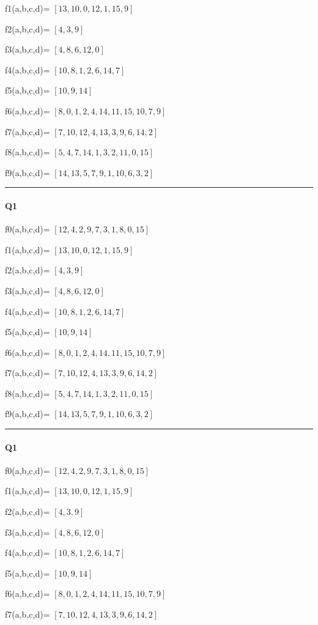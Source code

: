 f1(a,b,c,d)= $[13, 10, 0, 12, 1, 15, 9]$

f2(a,b,c,d)= $[4, 3, 9]$

f3(a,b,c,d)= $[4, 8, 6, 12, 0]$

f4(a,b,c,d)= $[10, 8, 1, 2, 6, 14, 7]$

f5(a,b,c,d)= $[10, 9, 14]$

f6(a,b,c,d)= $[8, 0, 1, 2, 4, 14, 11, 15, 10, 7, 9]$

f7(a,b,c,d)= $[7, 10, 12, 4, 13, 3, 9, 6, 14, 2]$

f8(a,b,c,d)= $[5, 4, 7, 14, 1, 3, 2, 11, 0, 15]$

f9(a,b,c,d)= $[14, 13, 5, 7, 9, 1, 10, 6, 3, 2]$


\hrule width 1\linewidth
\paragraph{Q1}


f0(a,b,c,d)= $[12, 4, 2, 9, 7, 3, 1, 8, 0, 15]$

f1(a,b,c,d)= $[13, 10, 0, 12, 1, 15, 9]$

f2(a,b,c,d)= $[4, 3, 9]$

f3(a,b,c,d)= $[4, 8, 6, 12, 0]$

f4(a,b,c,d)= $[10, 8, 1, 2, 6, 14, 7]$

f5(a,b,c,d)= $[10, 9, 14]$

f6(a,b,c,d)= $[8, 0, 1, 2, 4, 14, 11, 15, 10, 7, 9]$

f7(a,b,c,d)= $[7, 10, 12, 4, 13, 3, 9, 6, 14, 2]$

f8(a,b,c,d)= $[5, 4, 7, 14, 1, 3, 2, 11, 0, 15]$

f9(a,b,c,d)= $[14, 13, 5, 7, 9, 1, 10, 6, 3, 2]$


\hrule width 1\linewidth
\paragraph{Q1}


f0(a,b,c,d)= $[12, 4, 2, 9, 7, 3, 1, 8, 0, 15]$

f1(a,b,c,d)= $[13, 10, 0, 12, 1, 15, 9]$

f2(a,b,c,d)= $[4, 3, 9]$

f3(a,b,c,d)= $[4, 8, 6, 12, 0]$

f4(a,b,c,d)= $[10, 8, 1, 2, 6, 14, 7]$

f5(a,b,c,d)= $[10, 9, 14]$

f6(a,b,c,d)= $[8, 0, 1, 2, 4, 14, 11, 15, 10, 7, 9]$

f7(a,b,c,d)= $[7, 10, 12, 4, 13, 3, 9, 6, 14, 2]$

